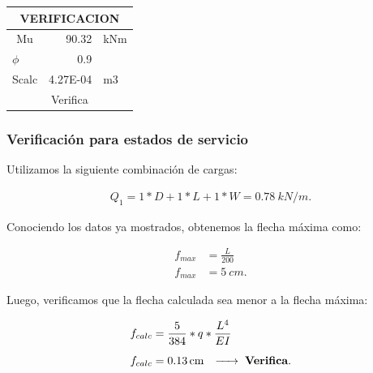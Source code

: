 \documentclass[../main.tex]{subfiles}
\begin{document}
\begin{table}[ht]
  \centering
    \begin{tabular}{|c|c|c|}
    \hline
    \multicolumn{3}{|c|}{\textbf{VERIFICACION}} \bigstrut\\
    \hline
    Mu    & \multicolumn{1}{r|}{90.32} & \multicolumn{1}{l|}{kNm} \bigstrut\\
    \hline
    \multicolumn{1}{|l|}{$\phi$} & \multicolumn{1}{r|}{0.9} &  \bigstrut\\
    \hline
    \multicolumn{1}{|l|}{Scalc} & \multicolumn{1}{r|}{4.27E-04} & \multicolumn{1}{l|}{m3} \bigstrut\\
    \hline
    \multicolumn{3}{|c|}{Verifica} \bigstrut\\
    \hline
    \end{tabular}%
\end{table}%


\subsubsection{Verificación para estados de servicio}

Utilizamos la siguiente combinación de cargas:

\begin{align*}
  Q_1 = 1*D + 1*L + 1*W = \SI{0.78}{kN / m}
.\end{align*}

Conociendo los datos ya mostrados, obtenemos la flecha máxima como:

\begin{align*}
  f_{max} &= \frac{L}{200} \\[5pt]
  f_{max} &= \SI{5}{cm}
.\end{align*}

Luego, verificamos que la flecha calculada sea menor a la flecha máxima:

\begin{align*}
  f_{calc} &= \frac{5}{384} * q * \frac{L^4}{EI} \\[5pt]
  f_{calc} &= \SI{0.13}{cm} \hspace{0.25cm} \xrightarrow{\hspace*{0.5cm}} \hspace{0.1cm} \textbf{Verifica}
.\end{align*}
\end{document}
